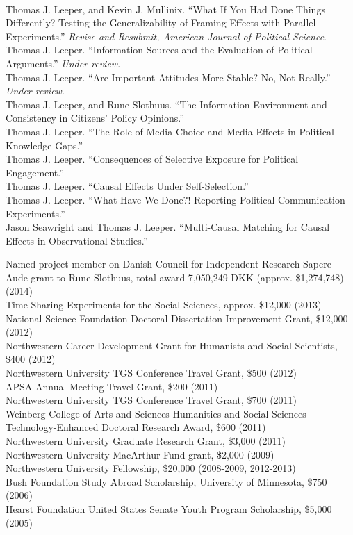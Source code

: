 \documentclass[12pt]{article}
\renewcommand{\section}[1]{\pagebreak[3]%
    \llap{\scshape\smash{\parbox[t]{\marginparwidth}{\raggedright {\color{lg}#1}}}}%
    \vspace{-\baselineskip}\par}
\newcommand{\topic}[1]{\pagebreak[3]\indent {\color{lg}{\footnotesize #1 }}\\}
\newcommand{\entry}[1]{\indent {\color{lg}\guillemotright}\hspace{2pt}#1\vspace{.25em}\\}
\begin{document}
\topic{Working Papers and Papers Under Review}
\entry{Thomas J. Leeper, and Kevin J. Mullinix. ``What If You Had Done Things Differently? Testing the Generalizability of Framing Effects with Parallel Experiments.'' {\em Revise and Resubmit, American Journal of Political Science}.}
\entry{Thomas J. Leeper. ``Information Sources and the Evaluation of Political Arguments.'' {\em Under review}.}
\entry{Thomas J. Leeper. ``Are Important Attitudes More Stable? No, Not Really.'' {\em Under review}.}
\entry{Thomas J. Leeper, and Rune Slothuus. ``The Information Environment and Consistency in Citizens' Policy Opinions.''}
\entry{Thomas J. Leeper. ``The Role of Media Choice and Media Effects in Political Knowledge Gaps.''}
\entry{Thomas J. Leeper. ``Consequences of Selective Exposure for Political Engagement.''}
\entry{Thomas J. Leeper. ``Causal Effects Under Self-Selection.''}
\entry{Thomas J. Leeper. ``What Have We Done?! Reporting Political Communication Experiments.''}
\entry{Jason Seawright and Thomas J. Leeper. ``Multi-Causal Matching for Causal Effects in Observational Studies.''}

\section{Grants\\and\\Funding}
\entry{Named project member on Danish Council for Independent Research Sapere Aude grant to Rune Slothuus, total award 7,050,249 DKK (approx. \$1,274,748) (2014)}
\entry{Time-Sharing Experiments for the Social Sciences, approx. \$12,000 (2013)}
\entry{National Science Foundation Doctoral Dissertation Improvement Grant, \$12,000 (2012)}
\entry{Northwestern Career Development Grant for Humanists and Social Scientists, \$400 (2012)}
\entry{Northwestern University TGS Conference Travel Grant, \$500 (2012)}
\entry{APSA Annual Meeting Travel Grant, \$200 (2011)}
\entry{Northwestern University TGS Conference Travel Grant, \$700 (2011)}
\entry{Weinberg College of Arts and Sciences Humanities and Social Sciences Technology-Enhanced Doctoral Research Award, \$600 (2011)}
\entry{Northwestern University Graduate Research Grant, \$3,000 (2011)}
\entry{Northwestern University MacArthur Fund grant, \$2,000 (2009)}
\entry{Northwestern University Fellowship, \$20,000 (2008-2009, 2012-2013)}
\entry{Bush Foundation Study Abroad Scholarship, University of Minnesota, \$750 (2006)}
\entry{Hearst Foundation United States Senate Youth Program Scholarship, \$5,000 (2005)}
\end{document}
